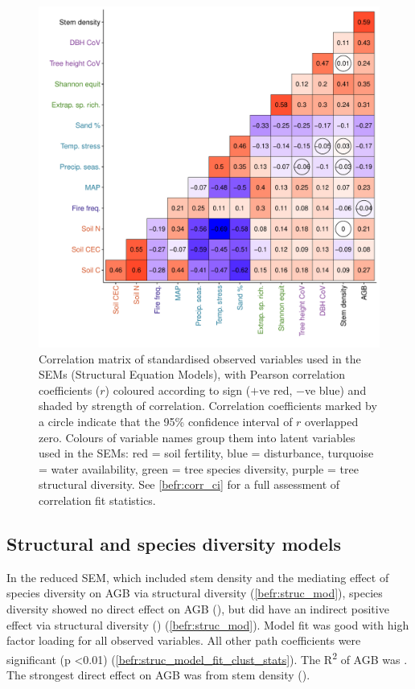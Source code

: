 \begin{refsection}
\begin{figure}
	\includegraphics[width=\linewidth]{img/corr_mat}
	\caption[Correlation matrix of observed variables used in analysis]{Correlation matrix of standardised observed variables used in the SEMs (Structural Equation Models), with Pearson correlation coefficients ($r$) coloured according to sign ($+$ve red, $-$ve blue) and shaded by strength of correlation. Correlation coefficients marked by a circle indicate that the 95\% confidence interval of $r$ overlapped zero. Colours of variable names group them into latent variables used in the SEMs: red = soil fertility, blue = disturbance, turquoise = water availability, green = tree species diversity, purple = tree structural diversity. See \autoref{befr:corr_ci} for a full assessment of correlation fit statistics.}
	\label{befr:corr_mat}
\end{figure}

\subsection{Structural and species diversity models}
\label{befr:ssec:struc}

In the reduced SEM, which included stem density and the mediating effect of species diversity on AGB via structural diversity (\autoref{befr:struc_mod}), species diversity showed no direct effect on AGB (\strucbetadb{}), but did have an indirect positive effect via structural diversity (\strucbetadib{}) (\autoref{befr:struc_mod}). Model fit was good with high factor loading for all observed variables. All other path coefficients were significant (p <0.01) (\autoref{befr:struc_model_fit_clust_stats}). The R\textsuperscript{2} of AGB was \strucrsq{}. The strongest direct effect on AGB was from stem density (\strucbetaib{}).


\end{refsection}
